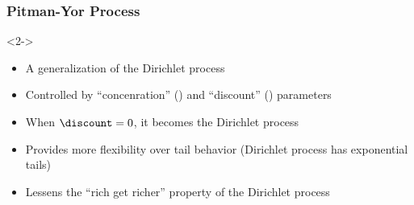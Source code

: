 \begin{frame}[t]
    \frametitle{Pitman-Yor Process}
    \begin{uncoverenv}<2->
    \begin{itemize}
        \item A generalization of the Dirichlet process
        \item Controlled by ``concenration'' (\concentration) and ``discount''
            (\discount) parameters
        \item When $\discount = 0$, it becomes the Dirichlet process
        \item Provides more flexibility over tail behavior (Dirichlet process
            has exponential tails)
        \item Lessens the ``rich get richer'' property of the Dirichlet process
    \end{itemize}
    \end{uncoverenv}
\end{frame}

